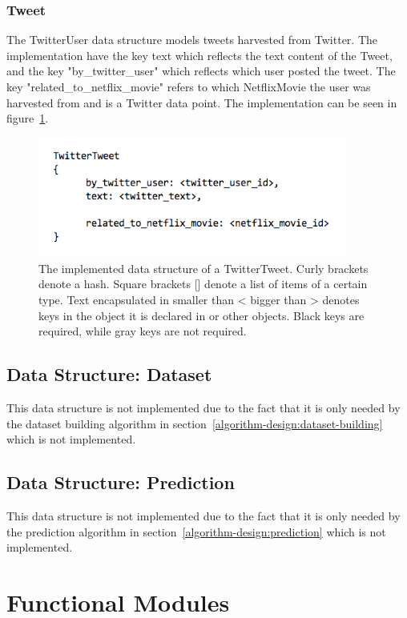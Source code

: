 \subsubsection{Tweet}
The TwitterUser data structure models tweets harvested from Twitter. The implementation have the key text which reflects the text content of the Tweet, and the key "by\_twitter\_user" which reflects which user posted the tweet. The key "related\_to\_netflix\_movie" refers to which NetflixMovie the user was harvested from and is a Twitter data point. The implementation can be seen in figure~\ref{figure:datastructure-twitter-tweet}.

	\begin{figure}[H]
	\includegraphics[width=4in]{image/datastructure-twitter-tweet.png}
	\centering
	\caption[TwitterTweet data structure]{The implemented data structure of a TwitterTweet. Curly brackets {} denote a hash. Square brackets [] denote a list of items of a certain type. Text encapsulated in smaller than < bigger than > denotes keys in the object it is declared in or other objects. Black keys are required, while gray keys are not required.}
	\label{figure:datastructure-twitter-tweet}
	\end{figure}

\subsection{Data Structure: Dataset}
This data structure is not implemented due to the fact that it is only needed by the dataset building algorithm in section~\ref{algorithm-design:dataset-building} which is not implemented.
\subsection{Data Structure: Prediction}
This data structure is not implemented due to the fact that it is only needed by the prediction algorithm in section~\ref{algorithm-design:prediction} which is not implemented.

\section{Functional Modules}\label{impl:Functional Modules}

